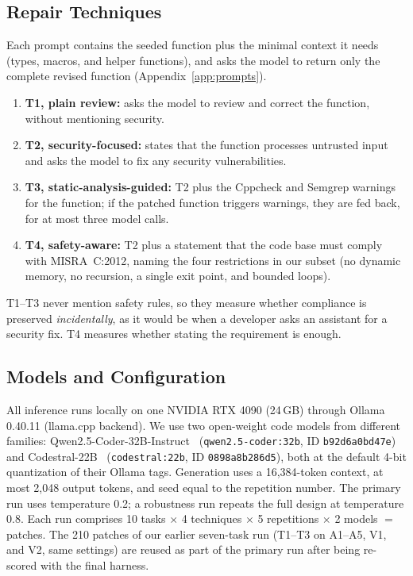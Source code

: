 \documentclass[12pt]{IEEEtran}
\begin{document}
\subsection{Repair Techniques}
Each prompt contains the seeded function plus the minimal context it needs (types, macros, and helper functions), and asks the model to return only the complete revised function (Appendix~\ref{app:prompts}).
\begin{enumerate}
    \item \textbf{T1, plain review:} asks the model to review and correct the function, without mentioning security.
    \item \textbf{T2, security-focused:} states that the function processes untrusted input and asks the model to fix any security vulnerabilities.
    \item \textbf{T3, static-analysis-guided:} T2 plus the Cppcheck and Semgrep warnings for the function; if the patched function triggers warnings, they are fed back, for at most three model calls.
    \item \textbf{T4, safety-aware:} T2 plus a statement that the code base must comply with MISRA~C:2012, naming the four restrictions in our subset (no dynamic memory, no recursion, a single exit point, and bounded loops).
\end{enumerate}
T1--T3 never mention safety rules, so they measure whether compliance is preserved \emph{incidentally}, as it would be when a developer asks an assistant for a security fix. T4 measures whether stating the requirement is enough.

\subsection{Models and Configuration}
All inference runs locally on one NVIDIA RTX 4090 (24\,GB) through Ollama 0.40.11 (llama.cpp backend). We use two open-weight code models from different families: Qwen2.5-Coder-32B-Instruct~\cite{qwen25coder} (\texttt{qwen2.5-coder:32b}, ID \texttt{b92d6a0bd47e}) and Codestral-22B~\cite{codestral} (\texttt{codestral:22b}, ID \texttt{0898a8b286d5}), both at the default 4-bit quantization of their Ollama tags. Generation uses a 16,384-token context, at most 2,048 output tokens, and seed equal to the repetition number. The primary run uses temperature 0.2; a robustness run repeats the full design at temperature 0.8. Each run comprises 10 tasks $\times$ 4 techniques $\times$ 5 repetitions $\times$ 2 models $=$  patches. The 210 patches of our earlier seven-task run (T1--T3 on A1--A5, V1, and V2, same settings) are reused as part of the primary run after being re-scored with the final harness.
\end{document}
